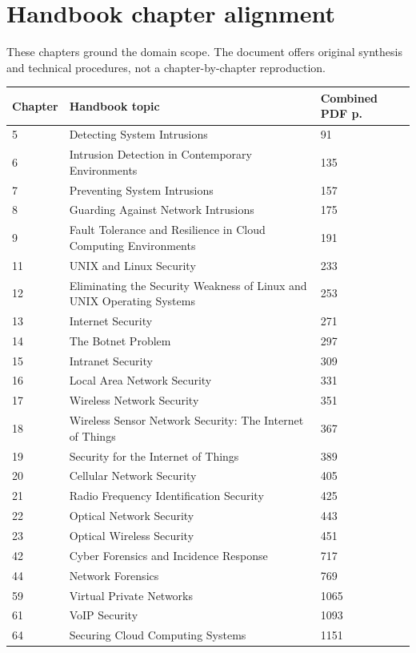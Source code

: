 \documentclass[10pt,letterpaper,oneside]{article}
\begin{document}
\section*{Handbook chapter alignment}
These chapters ground the domain scope. The document offers original synthesis and technical procedures, not a chapter-by-chapter reproduction.
\par\medskip\noindent\begin{longtable}{@{}p{}p{}p{}@{}}\toprule Chapter & Handbook topic & Combined PDF p. \\ \midrule\endhead5 & Detecting System Intrusions & 91 \\
6 & Intrusion Detection in Contemporary Environments & 135 \\
7 & Preventing System Intrusions & 157 \\
8 & Guarding Against Network Intrusions & 175 \\
9 & Fault Tolerance and Resilience in Cloud Computing Environments & 191 \\
11 & UNIX and Linux Security & 233 \\
12 & Eliminating the Security Weakness of Linux and UNIX Operating Systems & 253 \\
13 & Internet Security & 271 \\
14 & The Botnet Problem & 297 \\
15 & Intranet Security & 309 \\
16 & Local Area Network Security & 331 \\
17 & Wireless Network Security & 351 \\
18 & Wireless Sensor Network Security: The Internet of Things & 367 \\
19 & Security for the Internet of Things & 389 \\
20 & Cellular Network Security & 405 \\
21 & Radio Frequency Identification Security & 425 \\
22 & Optical Network Security & 443 \\
23 & Optical Wireless Security & 451 \\
42 & Cyber Forensics and Incidence Response & 717 \\
44 & Network Forensics & 769 \\
59 & Virtual Private Networks & 1065 \\
61 & VoIP Security & 1093 \\
64 & Securing Cloud Computing Systems & 1151 \\

\end{longtable}
\end{document}
